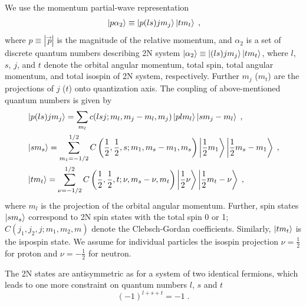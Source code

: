 We use the momentum partial-wave representation
\begin{equation}
\begin{split}
&\ket{p\alpha_{2}} \equiv \ket{p(ls)jm_{j}}\ket{tm_{t}}\;,\\
\end{split}
\label{eqalpha2}
\end{equation}
where $p\equiv |\!\vec{\, p}|$ is the magnitude of the relative momentum, and $\alpha_{2}$ is a set of discrete quantum numbers describing 2N system $\ket{\alpha_{2}} \equiv \ket{(ls)jm_{j}} \ket{tm_{t}}$, where $l$, $s$, $j$, and $t$ denote the orbital angular momentum, total spin, total angular momentum, and total isospin of 2N system, respectively. Further $m_{j}$ ($m_{t}$) are the projections of $j$ ($t$) onto quantization axis. The coupling of above-mentioned quantum numbers is given by
\begin{equation}
\begin{split}
&\ket{p(ls)jm_{j}} = \sum\limits_{m_{l}}c(lsj;m_{l},m_{j}-m_{l},m_{j})\ket{plm_{l}}\ket{sm_{j}-m_{l}}\;,\\
&\ket{sm_{s}} = \sum\limits_{m_{1} = -1/2}^{1/2}C\left(\frac{1}{2},\frac{1}{2}, s;m_{1},m_{s}-m_{1},m_{s}\right)\ket{\frac{1}{2}m_{1}}\ket{\frac{1}{2}m_{s}-m_{1}}\;,\\
&\ket{tm_{t}} = \sum\limits_{\nu = -1/2}^{1/2}C\left(\frac{1}{2},\frac{1}{2}, t;\nu,m_{s}-\nu,m_{t}\right)\ket{\frac{1}{2}\nu}\ket{\frac{1}{2}m_{t}-\nu}\;,
\end{split}
\end{equation}
where $m_{l}$ is the projection of the orbital angular momentum. Further, spin states $\ket{sm_{s}}$ correspond to 2N spin states with the total spin 0 or 1; $C(j_{1}, j_{2}, j; m_{1}, m_{2}, m)$ denote the Clebsch-Gordan coefficients. Similarly, $\ket{tm_{t}}$ is the ispospin state. We assume for individual particles the isospin projection $\nu = \frac{1}{2}$ for proton and $\nu = - \frac{1}{2}$ for neutron. 

The 2N states are antisymmetric as for a system of two identical fermions, which leads to one more constraint on quantum numbers $l$, $s$ and $t$
\begin{equation}
(-1)^{l+s+t} = -1\;.
\end{equation}

